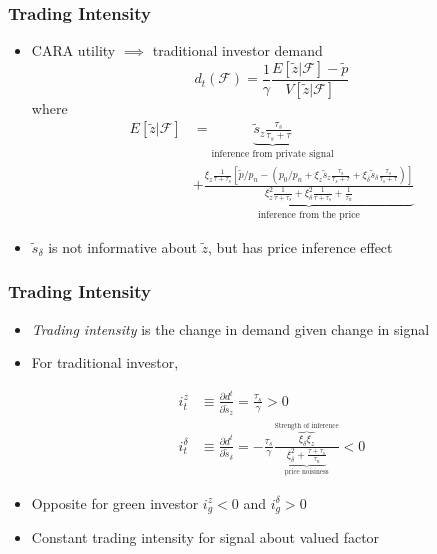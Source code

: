\documentclass[handout]{beamer}
\begin{document}
\begin{frame}
\frametitle{Trading Intensity}
\begin{itemize}[<+->]
\item CARA utility $\implies$ traditional investor demand
$$
d_t(\mathcal{F}) 
=
\frac{1}{\gamma} 
\frac{E[\tilde z | \mathcal{F}] - \tilde p}{V[\tilde z | \mathcal{F}]}
$$
where 
\begin{align*}
E[\tilde z | \mathcal{F}] 
&= 
\underbrace{\tilde s_z \frac{\tau_s}{\tau_s + \tau}}_{\text{inference from private signal}}\\
&+ 
\underbrace{\frac{\xi_z \frac{1}{\tau + \tau_s}[\tilde p/ p_n - (p_0/p_n + \xi_z \tilde s_z \frac{\tau_s}{\tau_s + \tau} + \xi_\delta \tilde s_\delta \frac{\tau_s}{\tau_s + \tau})]}{\xi_z^2 \frac{1}{\tau + \tau_s} + \xi_\delta^2 \frac{1}{\tau + \tau_s} + \frac{1}{\tau_n}}}_{\text{inference from the price}}
\end{align*}

\item $\tilde s_\delta$ is not informative about $\tilde z$, but has price inference effect

\end{itemize}
\end{frame}


\begin{frame}
\frametitle{Trading Intensity}
\begin{itemize}[<+->]
\item \textit{Trading intensity} is the change in demand given change in signal

\bigskip

\item For traditional investor,

\begin{align*}
i_t^z &\equiv \frac{\partial d^t}{\partial \tilde s_z} = \frac{\tau_s}{\gamma} > 0\\
i_t^\delta &\equiv \frac{\partial d^t}{\partial \tilde s_\delta} = -\frac{\tau_s}{\gamma} \frac{\overbrace{\xi_\delta \xi_z}^{\text{Strength of inference}}}{ \underbrace{\xi_\delta^2 + \frac{\tau + \tau_s}{\tau_n}}_{\text{price noisiness}}} < 0
\end{align*}

\item Opposite for green investor $i_g^z < 0$ and $i_g^\delta > 0$

\bigskip

\item Constant trading intensity for signal about valued factor

\end{itemize}
\end{frame}
\end{document}
